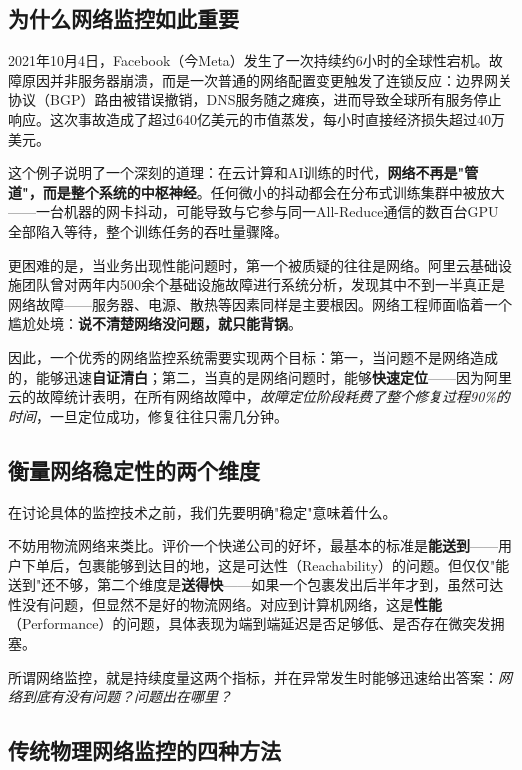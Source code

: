 \subsection{为什么网络监控如此重要}

2021年10月4日，Facebook（今Meta）发生了一次持续约6小时的全球性宕机。故障原因并非服务器崩溃，而是一次普通的网络配置变更触发了连锁反应：边界网关协议（BGP）路由被错误撤销，DNS服务随之瘫痪，进而导致全球所有服务停止响应。这次事故造成了超过640亿美元的市值蒸发，每小时直接经济损失超过40万美元。

这个例子说明了一个深刻的道理：在云计算和AI训练的时代，\textbf{网络不再是"管道"，而是整个系统的中枢神经}。任何微小的抖动都会在分布式训练集群中被放大——一台机器的网卡抖动，可能导致与它参与同一All-Reduce通信的数百台GPU全部陷入等待，整个训练任务的吞吐量骤降。

更困难的是，当业务出现性能问题时，第一个被质疑的往往是网络。阿里云基础设施团队曾对两年内500余个基础设施故障进行系统分析，发现其中不到一半真正是网络故障——服务器、电源、散热等因素同样是主要根因。网络工程师面临着一个尴尬处境：\textbf{说不清楚网络没问题，就只能背锅}。

因此，一个优秀的网络监控系统需要实现两个目标：第一，当问题不是网络造成的，能够迅速\textbf{自证清白}；第二，当真的是网络问题时，能够\textbf{快速定位}——因为阿里云的故障统计表明，在所有网络故障中，\emph{故障定位阶段耗费了整个修复过程90\%的时间}，一旦定位成功，修复往往只需几分钟。

\subsection{衡量网络稳定性的两个维度}

在讨论具体的监控技术之前，我们先要明确"稳定"意味着什么。

不妨用物流网络来类比。评价一个快递公司的好坏，最基本的标准是\textbf{能送到}——用户下单后，包裹能够到达目的地，这是可达性（Reachability）的问题。但仅仅"能送到"还不够，第二个维度是\textbf{送得快}——如果一个包裹发出后半年才到，虽然可达性没有问题，但显然不是好的物流网络。对应到计算机网络，这是\textbf{性能}（Performance）的问题，具体表现为端到端延迟是否足够低、是否存在微突发拥塞。

所谓网络监控，就是持续度量这两个指标，并在异常发生时能够迅速给出答案：\emph{网络到底有没有问题？问题出在哪里？}

\subsection{传统物理网络监控的四种方法}

